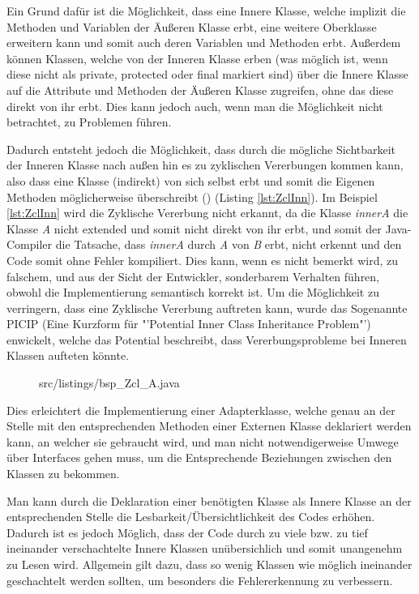 Ein Grund dafür ist die Möglichkeit, dass eine Innere Klasse, welche implizit die Methoden und Variablen der Äußeren Klasse erbt, eine weitere Oberklasse erweitern kann und somit auch deren Variablen und Methoden erbt.
Außerdem können Klassen, welche von der Inneren Klasse erben (was möglich ist, wenn diese nicht als private, protected oder final markiert sind) über die Innere Klasse auf die Attribute und Methoden der Äußeren Klasse zugreifen, ohne das diese direkt von ihr erbt. Dies kann jedoch auch, wenn man die Möglichkeit nicht betrachtet, zu Problemen führen.

Dadurch entsteht jedoch die Möglichkeit, dass durch die mögliche Sichtbarkeit der Inneren Klasse nach außen hin es zu zyklischen Vererbungen kommen kann, also dass eine Klasse (indirekt) von sich selbst erbt und somit die Eigenen Methoden möglicherweise überschreibt (\cite{DBLP:journals/corr/abs-1301-6260}) (Listing \ref{lst:ZclInn}).
Im Beispiel \ref{lst:ZclInn}  wird die Zyklische Vererbung nicht erkannt, da die Klasse {\it innerA} die Klasse {\it A} nicht extended und somit nicht direkt von ihr erbt, und somit der Java-Compiler die Tatsache, dass {\it innerA} durch {\it A} von {\it B} erbt, nicht erkennt und den Code somit ohne Fehler kompiliert.
Dies kann, wenn es nicht bemerkt wird, zu falschem, und aus der Sicht der Entwickler, sonderbarem Verhalten führen, obwohl die Implementierung semantisch korrekt ist.
Um die Möglichkeit zu verringern, dass eine Zyklische Vererbung auftreten kann, wurde das Sogenannte PICIP (Eine Kurzform für "'Potential Inner Class Inheritance Problem"') enwickelt, welche das Potential beschreibt, dass Vererbungsprobleme bei Inneren Klassen aufteten könnte.

\begin{figure}[hbt]
\lstset{language=Java}
 {src/listings/bsp_Zcl_A.java}
\end{figure}
\newpage

Dies erleichtert die Implementierung einer Adapterklasse, welche genau an der Stelle mit den entsprechenden Methoden einer Externen Klasse deklariert werden kann, an welcher sie gebraucht wird, und man nicht notwendigerweise Umwege über Interfaces gehen muss, um die Entsprechende Beziehungen zwischen den Klassen zu bekommen.

Man kann durch die Deklaration einer benötigten Klasse als Innere Klasse an der entsprechenden Stelle die Lesbarkeit/Übersichtlichkeit des Codes erhöhen.
Dadurch ist es jedoch Möglich, dass der Code durch zu viele bzw. zu tief ineinander verschachtelte Innere Klassen unübersichlich und somit unangenehm zu Lesen wird. Allgemein gilt dazu, dass so wenig Klassen wie möglich ineinander geschachtelt werden sollten, um besonders die Fehlererkennung zu verbessern.

